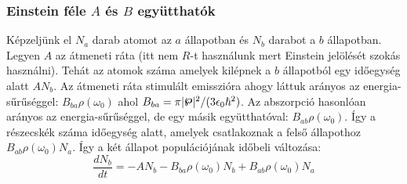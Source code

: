 \documentclass[../main.tex]{subfiles}
\begin{document}
\subsubsection{Einstein féle $A$ és $B$ együtthatók}
Képzeljünk el $N_a$ darab atomot az $a$ állapotban és $N_b$ darabot a $b$ állapotban. Legyen $A$ az átmeneti ráta (itt nem $R$-t használunk mert Einstein jelölését szokás használni).
Tehát az atomok száma amelyek kilépnek a $b$ állapotból egy időegység alatt $A N_b$. Az átmeneti ráta stimulált emisszióra ahogy láttuk arányos az energia-sűrűséggel:
$B_{ba} \rho(\omega_0)$ ahol $B_{ba} = \pi |\boldsymbol{\pw}|^2 / (3 \epsilon_0 \hbar^2)$. Az abszorpció hasonlóan arányos az energia-sűrűséggel, de egy másik együtthatóval:
$B_{ab} \rho(\omega_0)$. Így a részecskék száma időegység alatt, amelyek csatlakoznak a felső állapothoz $B_{ab} \rho(\omega_0) N_a$. Így a két állapot populációjának időbeli változása:
\begin{equation}
    \frac{dN_b}{dt} = - A N_b - B_{ba} \rho(\omega_0) N_b + B_{ab} \rho(\omega_0) N_a
\end{equation}
\end{document}
